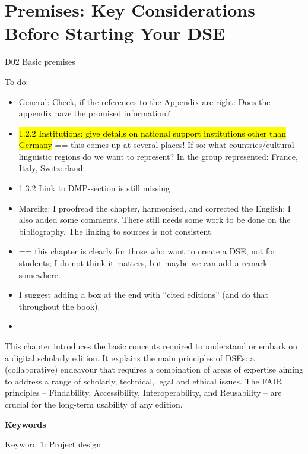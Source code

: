 \documentclass[
  letterpaper,
  DIV=11,
  numbers=noendperiod]{scrreprt}
\providecommand{\tightlist}{%
  \setlength{\itemsep}{0pt}\setlength{\parskip}{0pt}}\usepackage{longtable,booktabs,array}
\begin{document}

\chapter{Premises: Key Considerations Before Starting Your
DSE}\label{premises-key-considerations-before-starting-your-dse}

D02 Basic premises

To do:

\begin{itemize}
\tightlist
\item
  General: Check, if the references to the Appendix are right: Does the
  appendix have the promised information?
\end{itemize}

\begin{itemize}
\item
  \hl{1.2.2 Institutions: give details on national support institutions
  other than Germany} == this comes up at several places! If so: what
  countries/cultural-linguistic regions do we want to represent? In the
  group represented: France, Italy, Switzerland\hl{}
\item
  1.3.2 Link to DMP-section is still missing
\item
  Mareike: I proofread the chapter, harmonised, and corrected the
  English; I also added some comments. There still needs some work to be
  done on the bibliography. The linking to sources is not consistent.
\item
  == this chapter is clearly for those who want to create a DSE, not for
  students; I do not think it matters, but maybe we can add a remark
  somewhere.
\item
  I suggest adding a box at the end with ``cited editions'' (and do that
  throughout the book).
\item
\end{itemize}

This chapter introduces the basic concepts required to understand or
embark on a digital scholarly edition. It explains the main principles
of DSEs: a (collaborative) endeavour that requires a combination of
areas of expertise aiming to address a range of scholarly, technical,
legal and ethical issues. The FAIR principles -- Findability,
Accessibility, Interoperability, and Reusability -- are crucial for the
long-term usability of any edition.

\textbf{Keywords}

Keyword 1: Project design
\end{document}
